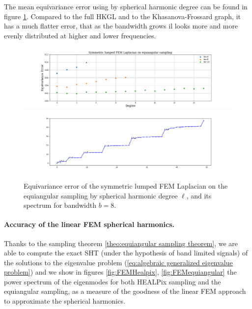 The mean equivariance error using by spherical harmonic degree can be found in figure \ref{fig:Equivariance error of the symmetric lumped FEM Laplacian}. Compared to the full HKGL and to the Khasanova-Frossard graph, it has a much flatter error, that as the bandwidth grows il looks more and more evenly distributed at higher and lower frequencies. 
\begin{figure}[h]
	\centering
	\includegraphics[width=\textwidth]{../codes/06.Equivariance_error/SymmetriclumpedFEMLaplacianonequiangularsampling.png}
	\includegraphics[width=\textwidth]{../codes/03.FEM_laplacian/equiangular/mass_lumping/BLB/img/FEM_eigenvalues_bw16.png}
	\caption{\label{fig:Equivariance error of the symmetric lumped FEM Laplacian}Equivariance error of the symmetric lumped FEM Laplacian on the equiangular sampling by spherical harmonic degree $\ell$, and its spectrum for bandwidth $b=8$.}
\end{figure}

\paragraph{Accuracy of the linear FEM spherical harmonics.} Thanks to the sampling theorem \ref{theo:equiangular sampling theorem}, we are able to compute the exact SHT (under the hypothesis of band limited signals) of the solutions to the eigenvalue problem (\ref{eq:algebraic generalized eigenvalue problem}) and we show in figures \ref{fig:FEMHealpix}, \ref{fig:FEMequiangular} the power spectrum of the eigenmodes for both HEALPix sampling and the equiangular sampling, as a measure of the goodness of the linear FEM approach to approximate the spherical harmonics.

